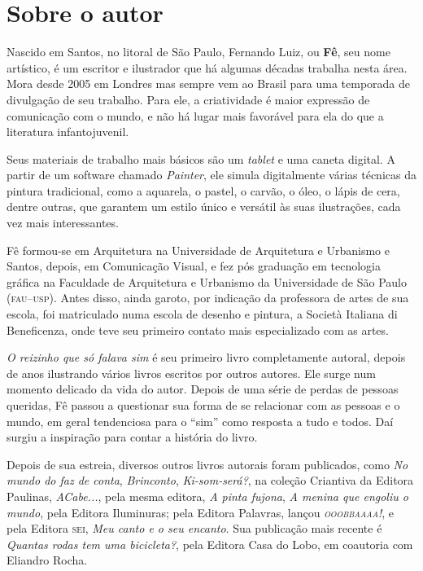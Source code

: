 \documentclass[11pt]{extarticle}
\begin{document}
\section{Sobre o autor}

Nascido em Santos, no litoral de São Paulo, Fernando Luiz, ou \textbf{Fê}, seu
nome artístico, é um escritor e ilustrador que há algumas décadas trabalha nesta área.
Mora desde 2005 em Londres mas sempre vem ao Brasil para uma temporada de divulgação de 
seu trabalho. Para ele, a criatividade é maior expressão de comunicação com o mundo, e não
há lugar mais favorável para ela do que a literatura infantojuvenil. 

Seus materiais de trabalho mais básicos são um \textit{tablet} e uma caneta digital.
A partir de um software chamado \textit{Painter}, ele simula digitalmente várias
técnicas da pintura tradicional, como a aquarela, o pastel, o carvão, o óleo, o lápis de cera,
dentre outras, que garantem um estilo único e versátil às suas ilustrações, cada vez mais interessantes. 


Fê formou-se em Arquitetura na Universidade de Arquitetura e Urbanismo e Santos, 
depois, em Comunicação Visual, e fez pós graduação em tecnologia gráfica na Faculdade de
Arquitetura e Urbanismo da Universidade de São Paulo (\textsc{fau--usp}).
Antes disso, ainda garoto, por indicação da professora de artes de sua escola, 
foi matriculado numa escola de desenho e pintura, a Società Italiana di Beneficenza,
onde teve seu primeiro contato mais especializado com as artes. 

\textit{O reizinho que só falava sim} é seu primeiro livro completamente autoral,
depois de anos ilustrando vários livros escritos por outros autores. 
Ele surge num momento delicado da vida do autor. Depois de uma série de perdas
de pessoas queridas, Fê passou a questionar sua forma de se relacionar com 
as pessoas e o mundo, em geral tendenciosa para o ``sim'' como resposta a tudo e
todos. Daí surgiu a inspiração para contar a história do livro. 

Depois de sua estreia, diversos outros livros autorais foram publicados,
como \textit{No mundo do faz de conta}, \textit{Brinconto}, \textit{Ki-som-será?}, na coleção Criantiva
da Editora Paulinas, \textit{ACabe...}, pela mesma editora, \textit{A pinta fujona},
\textit{A menina que engoliu o mundo}, pela Editora Iluminuras; pela Editora 
Palavras, lançou \textit{\textsc{ooobbaaaa}!}, e pela Editora \textsc{sei},
\textit{Meu canto e o seu encanto}. Sua publicação mais recente é \textit{Quantas rodas tem uma bicicleta?},
pela Editora Casa do Lobo, em coautoria com Eliandro Rocha. 
\end{document}
